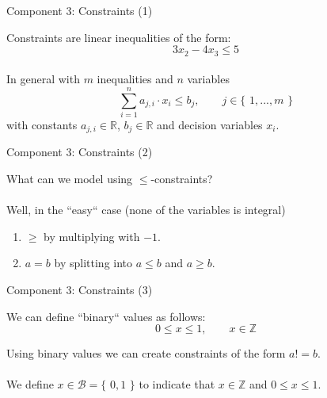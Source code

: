 \documentclass[10pt]{beamer}
\newcommand{\q}[1]{``#1``}
\newcommand{\curlO}{\{\,\,}
\newcommand{\curlC}{\,\,\}}
\begin{document}
\begin{frame}{Component 3: Constraints (1)}

Constraints are linear inequalities of the form:
\begin{equation}
	3x_2 - 4x_3 \leq 5
\end{equation}
\,\\
In general with $m$ inequalities and $n$ variables
\begin{equation}
	\sum\limits_{i=1}^{n} a_{j,i}\cdot x_i \leq b_j,\qquad j\in \curlO 1, ..., m \curlC
\end{equation}
with constants $a_{j,i} \in \mathbb{R}$, $b_j\in \mathbb{R}$ and decision variables $x_i$.
\end{frame}

\begin{frame}{Component 3: Constraints (2)}

What can we model using $\leq$-constraints?\\\,\\
Well, in the \q{easy} case (none of the variables is integral)
\begin{enumerate}
	\item $\geq$ by multiplying with $-1$.
	\item $a=b$ by splitting into $a\leq b$ and $a\geq b$.
\end{enumerate}


\end{frame}


\begin{frame}{Component 3: Constraints (3)}

We can define \q{binary} values as follows:\\
\begin{equation}
	0\leq x \leq 1, \qquad x\in \mathbb{Z}
\end{equation}

Using binary values we can create constraints of the form $a != b$.\\\,\\
We define $x \in \mathcal{B} = \curlO 0,1\curlC$ to indicate that $x\in \mathbb{Z}$ and $0\leq x\leq 1$.

\end{frame}
\end{document}
